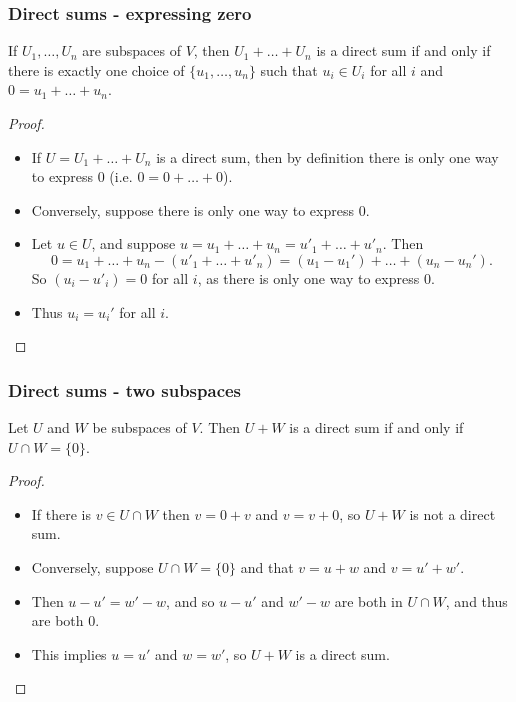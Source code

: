 \documentclass[handout]{beamer}
\begin{document}
\begin{frame}
\frametitle{Direct sums - expressing zero}
\begin{lemma}
If $U_1,\ldots,U_n$ are subspaces of $V$, then $U_1+\ldots +U_n$ is a direct sum if and only if there is exactly one choice of $\{u_1,\ldots, u_n\}$ such that $u_i\in U_i$ for all $i$ and $0 = u_1+\ldots +u_n$. 
\end{lemma}
\begin{proof}
\begin{itemize}
\item If $U=U_1+\ldots +U_n$ is a direct sum, then by definition there is only one way to express $0$ (i.e. $0= 0+\ldots + 0$). 
\item Conversely, suppose there is only one way to express $0$.
\item Let $u\in U$, and suppose $u = u_1+\ldots + u_n = u'_1+\ldots + u'_n$. Then 
\[0 = u_1+\ldots + u_n - (u'_1+\ldots + u'_n) = (u_1-u_1') + \ldots + (u_n-u_n').\]
So $(u_i- u'_i) = 0$ for all $i$, as there is only one way to express $0$. 
\item Thus $u_i = u_i'$ for all $i$.  
\end{itemize}
\end{proof}
\end{frame}

\begin{frame}
\frametitle{Direct sums - two subspaces}
\begin{lemma}
Let $U$ and $W$ be subspaces of $V$. Then $U+W$ is a direct sum if and only if $U\cap W = \{0\}$.
\end{lemma}
\begin{proof}
\begin{itemize}
\item If there is $v\in U\cap W$ then $v = 0 +v$ and $v = v + 0$, so $U+W$ is not a direct sum. 
\item Conversely, suppose $U\cap W=\{0\}$ and that $v = u + w$ and $v = u' + w'$. 
\item Then $u-u' = w' -w$, and so $u - u'$ and $w'-w$ are both in $U\cap W$, and thus are both $0$. 
\item This implies $u= u'$ and $w = w'$, so $U+W$ is a direct sum.
\end{itemize}
\end{proof}
\end{frame}
\end{document}
